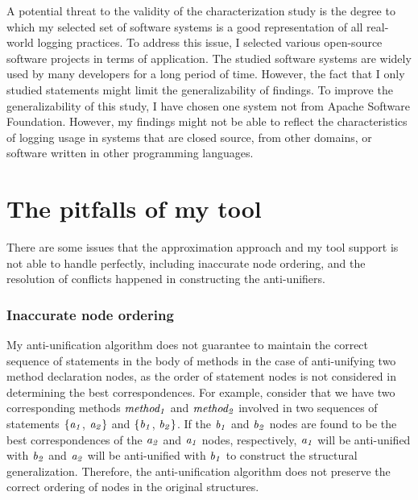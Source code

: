 

A potential threat to the validity of the characterization study is the degree to which my selected set of software systems is a good representation of all real-world logging practices. To address this issue, I selected various open-source software projects in terms of application. The studied software systems are widely used by many developers for a long period of time.  However, the fact that I only studied  statements might limit the generalizability of findings. To improve the generalizability of this study, I have chosen one system not from Apache Software Foundation. However, my findings might not be able to reflect the characteristics of logging usage in systems that are closed source, from other domains, or software written in other programming languages.



\section{The pitfalls of my tool}  \label{limitations}
There are some issues that the approximation approach and my tool support is not able to handle perfectly, including inaccurate node ordering, and the resolution of conflicts happened in constructing the anti-unifiers.


\subsubsection{Inaccurate node ordering}  \label{mismatch}
My anti-unification algorithm does not guarantee to maintain the correct sequence of statements in the body of methods in the case of anti-unifying two method declaration nodes, as the order of statement nodes is not considered in determining the best correspondences. For example, consider that we have two corresponding methods $\mathit{method_1}$ and $\mathit{method_2}$ involved in two sequences of statements $\{\mathit{a_1}$, $\mathit{a_2}\}$ and $\{\mathit{b_1}$, $\mathit{b_2}\}$. If the $\mathit{b_1}$ and $\mathit{b_2}$ nodes are found to be the best correspondences of the $\mathit{a_2}$ and $\mathit{a_1}$ nodes, respectively, $\mathit{a_1}$ will be anti-unified with $\mathit{b_2}$  and $\mathit{a_2}$ will be anti-unified with $\mathit{b_1}$ to construct the structural generalization. Therefore, the anti-unification algorithm does not preserve the correct ordering of nodes in the original structures.

